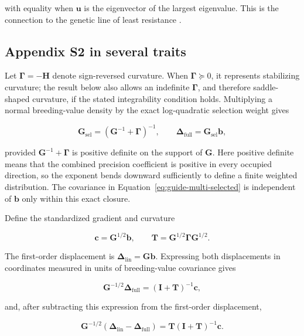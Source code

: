 \documentclass[11pt]{article}
\newcommand{\vect}[1]{\boldsymbol{#1}}
\newcommand{\mat}[1]{\mathbf{#1}}
\newcommand{\bGamma}{\boldsymbol{\Gamma}}
\newcommand{\Gsel}{\ensuremath{\mat G_{\mathrm{sel}}}}
\begin{document}
with equality when $\vect u$ is the eigenvector of the largest eigenvalue.
This is the connection to the genetic line of least resistance
\citep{Schluter1996}.

\subsection{Appendix S2 in several traits}
\label{sec:multi-s2}

Let $\bGamma=-\mat H$ denote sign-reversed curvature.  When
$\bGamma\succeq0$, it represents stabilizing curvature; the result below also
allows an indefinite $\bGamma$, and therefore saddle-shaped curvature, if the
stated integrability condition holds.  Multiplying a normal breeding-value
density by the exact log-quadratic selection weight gives

\begin{equation}
\Gsel=(\mat G^{-1}+\bGamma)^{-1},
\qquad
\vect\Delta_{\mathrm{full}}=\Gsel\vect b,
\label{eq:guide-multi-selected}
\end{equation}

provided $\mat G^{-1}+\bGamma$ is positive definite on the support of
$\mat G$.  Here positive definite means that the combined precision
coefficient is positive in every occupied direction, so the exponent bends
downward sufficiently to define a finite weighted distribution.  The
covariance in Equation~\eqref{eq:guide-multi-selected} is
independent of $\vect b$ only within this exact closure.

Define the standardized gradient and curvature

\begin{equation}
\vect c=\mat G^{1/2}\vect b,
\qquad
\mat T=\mat G^{1/2}\bGamma\mat G^{1/2}.
\end{equation}

The first-order displacement is $\vect\Delta_{\mathrm{lin}}=\mat G\vect b$.
Expressing both displacements in coordinates measured in units of
breeding-value covariance gives

\begin{equation}
\mat G^{-1/2}\vect\Delta_{\mathrm{full}}
=(\mat I+\mat T)^{-1}\vect c,
\label{eq:guide-whitened-full}
\end{equation}

and, after subtracting this expression from the first-order displacement,

\begin{equation}
\mat G^{-1/2}
(\vect\Delta_{\mathrm{lin}}-\vect\Delta_{\mathrm{full}})
=\mat T(\mat I+\mat T)^{-1}\vect c.
\label{eq:guide-whitened-error}
\end{equation}
\end{document}
